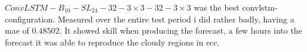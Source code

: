 $ConvLSTM-B_{10}-SL_{24}-32-3\times3-32-3\times3$ was the best \acrshort{convlstm}-configuration. 
Measured over the entire test period i did rather badly, having a \acrshort{mae} of $0.48502$. It showed skill when producing the forecast, a few hours into the forecast it was able to reproduce the cloudy regions in \acrshort{ecc}.  




